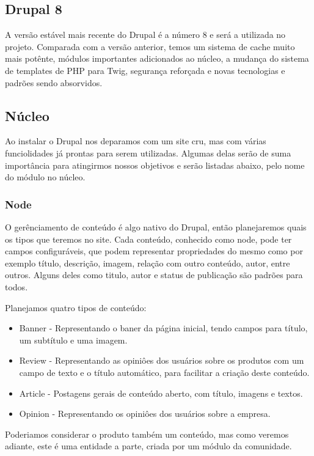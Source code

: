 \documentclass[
	12pt,				%
    oneside,			%
	a4paper,			%
	english,			%
	french,				%
	spanish,			%
	brazil				%
	]{abntex2}
\begin{document}
\subsection{Drupal 8}

A versão estável mais recente do Drupal é a número 8 e será a utilizada no projeto. Comparada com a versão anterior, temos um sistema de cache muito mais potênte, módulos importantes adicionados ao núcleo, a mudança do sistema de templates de PHP para Twig, segurança reforçada e novas tecnologias e padrões sendo absorvidos. 

\subsection{Núcleo}

Ao instalar o Drupal nos deparamos com um site cru, mas com várias funciolidades já prontas para serem utilizadas. Algumas delas serão de suma importância para atingirmos nossos objetivos e serão listadas abaixo, pelo nome do módulo no núcleo.

\subsubsection{Node}
O gerênciamento de conteúdo é algo nativo do Drupal, então planejaremos quais os tipos que teremos no site. Cada conteúdo, conhecido como node, pode ter campos configuráveis, que podem representar propriedades do mesmo como por exemplo título, descrição, imagem, relação com outro conteúdo, autor, entre outros. Alguns deles como titulo, autor e status de publicação são padrões para todos.

Planejamos quatro tipos de conteúdo:
\begin{itemize}
  \item Banner - Representando o baner da página inicial, tendo campos para título, um subtítulo e uma imagem.
  \item Review - Representando as opiniôes dos usuários sobre os produtos com um campo de texto e o título automático, para facilitar a criação deste conteúdo.
  \item Article - Postagens gerais de conteúdo aberto, com título, imagens e textos.
  \item Opinion - Representando os opiniôes dos usuários sobre a empresa.
\end{itemize}

Poderiamos considerar o produto também um conteúdo, mas como veremos adiante, este é uma entidade a parte, criada por um módulo da comunidade.
\end{document}
